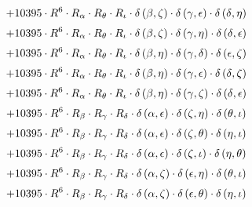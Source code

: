 \begin{subequations}
\begin{gather}
 \\[0.2em] \notag 		 + 10395 \cdot R^{6} \cdot R_{\alpha{}} \cdot R_{\theta{}} \cdot R_{\iota{}} \cdot \delta{}\left(\beta{}, \zeta{}\right) \cdot \delta{}\left(\gamma{}, \epsilon{}\right) \cdot \delta{}\left(\delta{}, \eta{}\right) 
 \\[0.2em] \notag 		 + 10395 \cdot R^{6} \cdot R_{\alpha{}} \cdot R_{\theta{}} \cdot R_{\iota{}} \cdot \delta{}\left(\beta{}, \zeta{}\right) \cdot \delta{}\left(\gamma{}, \eta{}\right) \cdot \delta{}\left(\delta{}, \epsilon{}\right) 
 \\[0.2em] \notag 		 + 10395 \cdot R^{6} \cdot R_{\alpha{}} \cdot R_{\theta{}} \cdot R_{\iota{}} \cdot \delta{}\left(\beta{}, \eta{}\right) \cdot \delta{}\left(\gamma{}, \delta{}\right) \cdot \delta{}\left(\epsilon{}, \zeta{}\right) 
 \\[0.2em] \notag 		 + 10395 \cdot R^{6} \cdot R_{\alpha{}} \cdot R_{\theta{}} \cdot R_{\iota{}} \cdot \delta{}\left(\beta{}, \eta{}\right) \cdot \delta{}\left(\gamma{}, \epsilon{}\right) \cdot \delta{}\left(\delta{}, \zeta{}\right) 
 \\[0.2em] \notag 		 + 10395 \cdot R^{6} \cdot R_{\alpha{}} \cdot R_{\theta{}} \cdot R_{\iota{}} \cdot \delta{}\left(\beta{}, \eta{}\right) \cdot \delta{}\left(\gamma{}, \zeta{}\right) \cdot \delta{}\left(\delta{}, \epsilon{}\right) 
 \\[0.2em] \notag 		 + 10395 \cdot R^{6} \cdot R_{\beta{}} \cdot R_{\gamma{}} \cdot R_{\delta{}} \cdot \delta{}\left(\alpha{}, \epsilon{}\right) \cdot \delta{}\left(\zeta{}, \eta{}\right) \cdot \delta{}\left(\theta{}, \iota{}\right) 
 \\[0.2em] \notag 		 + 10395 \cdot R^{6} \cdot R_{\beta{}} \cdot R_{\gamma{}} \cdot R_{\delta{}} \cdot \delta{}\left(\alpha{}, \epsilon{}\right) \cdot \delta{}\left(\zeta{}, \theta{}\right) \cdot \delta{}\left(\eta{}, \iota{}\right) 
 \\[0.2em] \notag 		 + 10395 \cdot R^{6} \cdot R_{\beta{}} \cdot R_{\gamma{}} \cdot R_{\delta{}} \cdot \delta{}\left(\alpha{}, \epsilon{}\right) \cdot \delta{}\left(\zeta{}, \iota{}\right) \cdot \delta{}\left(\eta{}, \theta{}\right) 
 \\[0.2em] \notag 		 + 10395 \cdot R^{6} \cdot R_{\beta{}} \cdot R_{\gamma{}} \cdot R_{\delta{}} \cdot \delta{}\left(\alpha{}, \zeta{}\right) \cdot \delta{}\left(\epsilon{}, \eta{}\right) \cdot \delta{}\left(\theta{}, \iota{}\right) 
 \\[0.2em] \notag 		 + 10395 \cdot R^{6} \cdot R_{\beta{}} \cdot R_{\gamma{}} \cdot R_{\delta{}} \cdot \delta{}\left(\alpha{}, \zeta{}\right) \cdot \delta{}\left(\epsilon{}, \theta{}\right) \cdot \delta{}\left(\eta{}, \iota{}\right) 

\end{gather}
\end{subequations}
